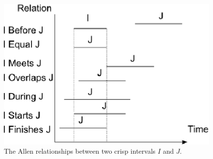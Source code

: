 \begin{figure}[h]
   \centering
   \includegraphics[width=0.8\columnwidth]{graphs/allen.eps}
   \caption{The Allen relationships between two crisp intervals $I$ and $J$.  }
   \label{fig:allen-relationships}
 \end{figure}
